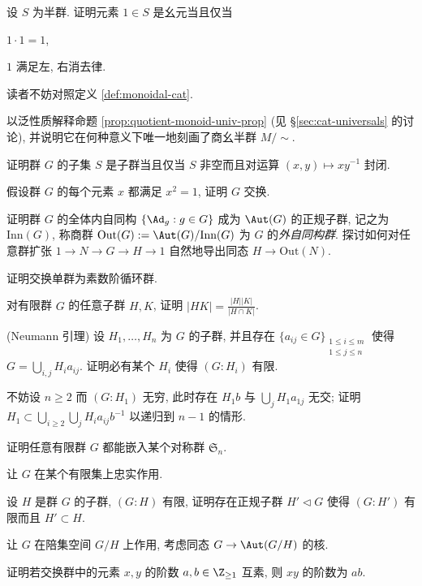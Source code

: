 \begin{Exercises}
	\item 设 $S$ 为半群. 证明元素 $1 \in S$ 是幺元当且仅当
		\begin{inparaenum}[(i)]
			\item $1 \cdot 1 = 1$,
			\item $1$ 满足左, 右消去律.
		\end{inparaenum}
		读者不妨对照定义 \ref{def:monoidal-cat}.
	\item 以泛性质解释命题 \ref{prop:quotient-monoid-univ-prop} (见 \S\ref{sec:cat-universals} 的讨论), 并说明它在何种意义下唯一地刻画了商幺半群 $M/\sim$.
	\item 证明群 $G$ 的子集 $S$ 是子群当且仅当 $S$ 非空而且对运算 $(x,y) \mapsto xy^{-1}$ 封闭.
	\item 假设群 $G$ 的每个元素 $x$ 都满足 $x^2=1$, 证明 $G$ 交换.
	\item 证明群 $G$ 的全体内自同构 $\{\Ad_g: g \in G\}$ 成为 $\Aut(G)$ 的正规子群, 记之为 $\text{Inn}(G)$, 称商群 $\text{Out}(G) := \Aut(G)/\text{Inn}(G)$ 为 $G$ 的\emph{外自同构群}. 探讨如何对任意群扩张 $1 \to N \to G \to H \to 1$ 自然地导出同态 $H \to \text{Out}(N)$. 
	\item 证明交换单群为素数阶循环群.
	\item 对有限群 $G$ 的任意子群 $H, K$, 证明 $|HK| = \frac{|H||K|}{|H \cap K|}$.
	\item (Neumann 引理) 设 $H_1, \ldots, H_n$ 为 $G$ 的子群, 并且存在 $\{ a_{ij} \in G \}_{\substack{1 \leq i \leq m \\ 1 \leq j \leq n}}$ 使得 $G = \bigcup_{i,j} H_i a_{ij}$. 证明必有某个 $H_i$ 使得 $(G:H_i)$ 有限.
	\begin{hint} 不妨设 $n \geq 2$ 而 $(G:H_1)$ 无穷, 此时存在 $H_1 b$ 与 $\bigcup_j H_1 a_{1j}$ 无交; 证明 $H_1 \subset \bigcup_{i \geq 2} \bigcup_j H_i a_{ij} b^{-1}$ 以递归到 $n-1$ 的情形.\end{hint}
	\item 证明任意有限群 $G$ 都能嵌入某个对称群 $\mathfrak{S}_n$. \begin{hint} 让 $G$ 在某个有限集上忠实作用.\end{hint}
	\item 设 $H$ 是群 $G$ 的子群, $(G:H)$ 有限, 证明存在正规子群 $H' \lhd G$ 使得 $(G:H')$ 有限而且 $H' \subset H$. \begin{hint} 让 $G$ 在陪集空间 $G/H$ 上作用, 考虑同态 $G \to \Aut(G/H)$ 的核. \end{hint}
	\item 证明若交换群中的元素 $x, y$ 的阶数 $a,b \in \Z_{\geq 1}$ 互素, 则 $xy$ 的阶数为 $ab$.

\end{Exercises}
